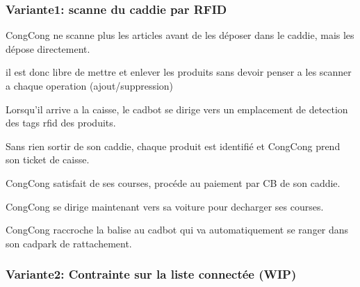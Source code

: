 \subsubsection{Variante1: scanne du caddie par RFID}

\startitemize
\item CongCong ne scanne plus les articles avant de les déposer dans le caddie, mais les dépose directement.
\item il est donc libre de mettre et enlever les produits sans devoir penser a les scanner a chaque operation (ajout/suppression)
\item Lorsqu'il arrive a la caisse, le cadbot se dirige vers un emplacement de detection des tags rfid des produits.
\item Sans rien sortir de son caddie, chaque produit est identifié et CongCong prend son ticket de caisse.
\item CongCong satisfait de ses courses, procéde au paiement par CB de son caddie.
\item CongCong se dirige maintenant vers sa voiture pour decharger ses courses.
\item CongCong raccroche la balise au cadbot qui va automatiquement se ranger dans son cadpark de rattachement.
\stopitemize

\subsubsection{Variante2: Contrainte sur la liste connectée (WIP)}

